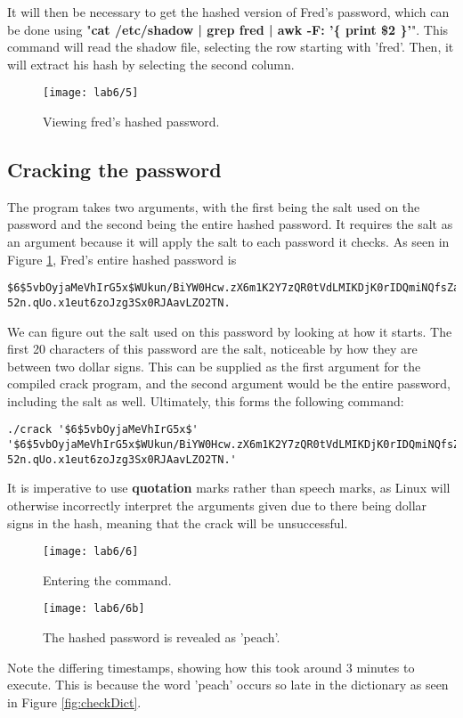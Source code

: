 It will then be necessary to get the hashed version of Fred's password, which can be done using
"\textbf{cat /etc/shadow | grep fred | awk -F: '\{ print \$2 \}'}".
This command will read the shadow file, selecting the row starting with 'fred'.
Then, it will extract his hash by selecting the second column.

\begin{figure}[H]
    \centering
    \texttt{[image: lab6/5]}
    \caption{Viewing fred's hashed password.}
    \label{fig:viewFredHash}
\end{figure}

\subsection{Cracking the password}\label{subsec:cracking-the-password}
The program takes two arguments, with the first being the salt used on the password and the
second being the entire hashed password.
It requires the salt as an argument because it will apply the salt to each password it checks.
As seen in Figure \ref{fig:viewFredHash}, Fred's entire hashed password is

\begin{verbatim}
$6$5vbOyjaMeVhIrG5x$WUkun/BiYW0Hcw.zX6m1K2Y7zQR0tVdLMIKDjK0rIDQmiNQfsZa
52n.qUo.x1eut6zoJzg3Sx0RJAavLZO2TN.
\end{verbatim}

We can figure out the salt used on this password by looking at how it starts.
The first 20 characters of this password are the salt, noticeable by how they are between two dollar signs.
This can be supplied as the first argument for the compiled crack program, and the second argument would be the
entire password, including the salt as well.
Ultimately, this forms the following command:

\begin{verbatim}
./crack '$6$5vbOyjaMeVhIrG5x$'
'$6$5vbOyjaMeVhIrG5x$WUkun/BiYW0Hcw.zX6m1K2Y7zQR0tVdLMIKDjK0rIDQmiNQfsZa
52n.qUo.x1eut6zoJzg3Sx0RJAavLZO2TN.'
\end{verbatim}

It is imperative to use \textbf{quotation} marks rather than speech marks, as Linux will otherwise incorrectly
interpret the arguments given due to there being dollar signs in the hash, meaning that the crack will be
unsuccessful.

\begin{figure}[H]
    \centering
    \texttt{[image: lab6/6]}
    \caption{Entering the command.}
    \label{fig:cracking}
\end{figure}

\begin{figure}[H]
    \centering
    \texttt{[image: lab6/6b]}
    \caption{The hashed password is revealed as 'peach'.}
    \label{fig:cracked}
\end{figure}

Note the differing timestamps, showing how this took around 3 minutes to execute.
This is because the word 'peach' occurs so late in the dictionary as seen in Figure \ref{fig:checkDict}.



